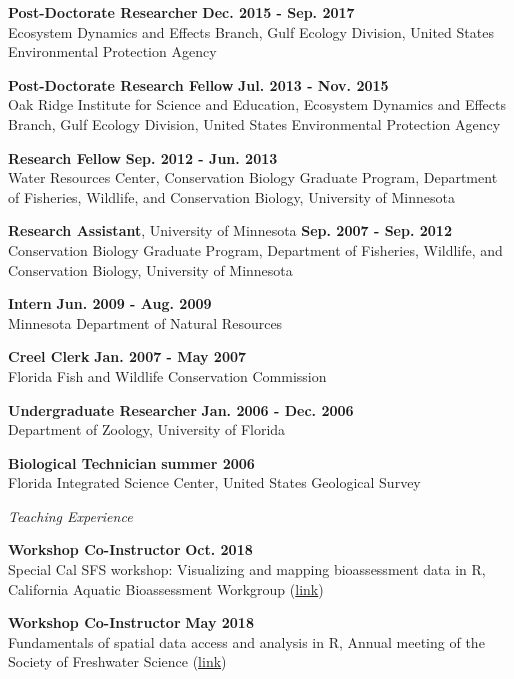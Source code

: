 \documentclass[letterpaper,12pt]{article}
\newcommand{\sectitle}[1]{\vspace{\baselineskip} \centerline{\large{\textit{#1}}}}
\begin{document}
{\bf Post-Doctorate Researcher} \hfill {\bf Dec. 2015 - Sep. 2017}\\
Ecosystem Dynamics and Effects Branch, Gulf Ecology Division, United States Environmental Protection Agency

{\bf Post-Doctorate Research Fellow} \hfill {\bf Jul. 2013 - Nov. 2015}\\
Oak Ridge Institute for Science and Education, Ecosystem Dynamics and Effects Branch, Gulf Ecology Division, United States Environmental Protection Agency

{\bf Research Fellow} \hfill {\bf Sep. 2012 - Jun. 2013} \\
Water Resources Center, Conservation Biology Graduate Program, Department of Fisheries, Wildlife, and Conservation Biology, University of Minnesota

{\bf Research Assistant}, University of Minnesota \hfill {\bf Sep. 2007 - Sep. 2012} \\
Conservation Biology Graduate Program, Department of Fisheries, Wildlife, and Conservation Biology, University of Minnesota

{\bf Intern} \hfill {\bf Jun. 2009 - Aug. 2009} \\
Minnesota Department of Natural Resources

{\bf Creel Clerk} \hfill {\bf Jan. 2007 - May 2007} \\
Florida Fish and Wildlife Conservation Commission

{\bf Undergraduate Researcher} \hfill {\bf Jan. 2006 - Dec. 2006} \\
Department of Zoology, University of Florida

{\bf Biological Technician} \hfill {\bf summer 2006} \\
Florida Integrated Science Center, United States Geological Survey

\sectitle{Teaching Experience}

{\bf Workshop Co-Instructor} \hfill {\bf Oct. 2018}\\
Special Cal SFS workshop: Visualizing and mapping bioassessment data in R, California Aquatic Bioassessment Workgroup ({\footnotesize\href{https://sccwrp.github.io/CABW2018_R_training}{link}})

{\bf Workshop Co-Instructor} \hfill {\bf May 2018}\\
Fundamentals of spatial data access and analysis in R, Annual meeting of the Society of Freshwater Science ({\footnotesize\href{https://ryan-hill.github.io/sfs-r-gis-2018/}{link}})
\end{document}
